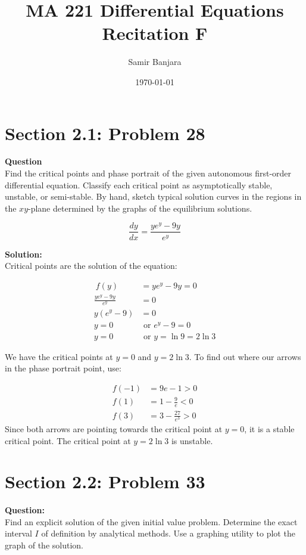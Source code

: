 \documentclass[12pt]{article}
\title{MA 221 Differential Equations Recitation F}
\author{Samir Banjara}
\date{\today}
\begin{document}
\maketitle

\section*{Section 2.1: Problem 28}
\raggedright
\textbf{Question} \\
Find the critical points and phase portrait of the given autonomous first-order differential equation. Classify each critical point as asymptotically stable, unstable, or semi-stable. By hand, sketch typical solution curves in the regions in the \(xy\)-plane determined by the graphs of the equilibrium solutions.

\[
\frac{dy}{dx} = \frac{ye^{y} - 9y}{e^y}
\]

\textbf{Solution:} \\
Critical points are the solution of the equation:

\[
\begin{aligned}\
    f(y) &= ye^{y} - 9y = 0 \\
    \frac{ye^y - 9y}{e^y} &= 0 \\
    y(e^y - 9) &= 0 \\
    y = 0 &\text{ or } e^y - 9 = 0\\
    y = 0 &\text{ or } y = \ln 9 = 2\ln 3
\end{aligned}
\]

We have the critical points at \(y = 0\) and \(y = 2\ln 3\). To find out where our arrows in the phase portrait point, use:

\[
\begin{aligned}
    f(-1) &= 9e - 1 > 0 \\
    f(1) &= 1 - \frac{9}{e} < 0\\ 
    f(3) &= 3 - \frac{27}{e^3} > 0
\end{aligned}
\]
Since both arrows are pointing towards the critical point at \(y = 0\), it is a stable critical point. The critical point at \(y = 2\ln 3\) is unstable.

\newpage

\section*{Section 2.2: Problem 33}

\raggedright
\textbf{Question:} \\
Find an explicit solution of the given initial value problem. Determine the exact interval \(I\) of definition by analytical methods. Use a graphing utility to plot the graph of the solution.
\end{document}
